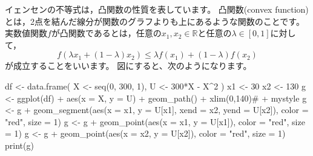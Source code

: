 \documentclass[
  letterpaper,
  pandoc,
  ja=standard,
  jafont = hiragino-pron]{ltjsbook}
\newenvironment{Shaded}{\begin{snugshade}}{\end{snugshade}}
\newcommand{\AttributeTok}[1]{\textcolor[rgb]{0.40,0.45,0.13}{#1}}
\newcommand{\CommentTok}[1]{\textcolor[rgb]{0.37,0.37,0.37}{#1}}
\newcommand{\DecValTok}[1]{\textcolor[rgb]{0.68,0.00,0.00}{#1}}
\newcommand{\FunctionTok}[1]{\textcolor[rgb]{0.28,0.35,0.67}{#1}}
\newcommand{\NormalTok}[1]{\textcolor[rgb]{0.00,0.23,0.31}{#1}}
\newcommand{\OtherTok}[1]{\textcolor[rgb]{0.00,0.23,0.31}{#1}}
\newcommand{\SpecialCharTok}[1]{\textcolor[rgb]{0.37,0.37,0.37}{#1}}
\newcommand{\StringTok}[1]{\textcolor[rgb]{0.13,0.47,0.30}{#1}}
\begin{document}
\begin{tcolorbox}[enhanced jigsaw, colframe=quarto-callout-important-color-frame, breakable, rightrule=.15mm, coltitle=black, title=\textcolor{quarto-callout-important-color}{\faExclamation}\hspace{0.5em}{イェンセンの不等式}, colbacktitle=quarto-callout-important-color!10!white, leftrule=.75mm, colback=white, left=2mm, arc=.35mm, opacityback=0, titlerule=0mm, toptitle=1mm, bottomtitle=1mm, bottomrule=.15mm, toprule=.15mm, opacitybacktitle=0.6]

イェンセンの不等式は，凸関数の性質を表しています。 凸関数(convex
function)とは，2点を結んだ線分が関数のグラフよりも上にあるような関数のことです。
実数値関数\(f\)が凸関数であるとは，任意の\(x_1, x_2 \in \mathbb{R}\)と任意の\(\lambda \in [0,1]\)に対して，
\[
f(\lambda x_1 + (1-\lambda)x_2) \leq \lambda f(x_1) + (1-\lambda)f(x_2)
\] が成立することをいいます。 図にすると、次のようになります。

\begin{Shaded}
\begin{Highlighting}[]
\NormalTok{df }\OtherTok{\textless{}{-}} \FunctionTok{data.frame}\NormalTok{(}
\NormalTok{    X }\OtherTok{\textless{}{-}} \FunctionTok{seq}\NormalTok{(}\DecValTok{0}\NormalTok{, }\DecValTok{300}\NormalTok{, }\DecValTok{1}\NormalTok{),}
\NormalTok{    U }\OtherTok{\textless{}{-}} \DecValTok{300}\SpecialCharTok{*}\NormalTok{X }\SpecialCharTok{{-}}\NormalTok{ X}\SpecialCharTok{\^{}}\DecValTok{2}
\NormalTok{)}
\NormalTok{x1 }\OtherTok{\textless{}{-}} \DecValTok{30}
\NormalTok{x2 }\OtherTok{\textless{}{-}} \DecValTok{130}
\NormalTok{g }\OtherTok{\textless{}{-}} \FunctionTok{ggplot}\NormalTok{(df) }\SpecialCharTok{+} \FunctionTok{aes}\NormalTok{(}\AttributeTok{x =}\NormalTok{ X, }\AttributeTok{y =}\NormalTok{ U) }\SpecialCharTok{+} \FunctionTok{geom\_path}\NormalTok{() }\SpecialCharTok{+} \FunctionTok{xlim}\NormalTok{(}\DecValTok{0}\NormalTok{,}\DecValTok{140}\NormalTok{)}\CommentTok{\# + mystyle}
\NormalTok{g }\OtherTok{\textless{}{-}}\NormalTok{ g }\SpecialCharTok{+} \FunctionTok{geom\_segment}\NormalTok{(}\FunctionTok{aes}\NormalTok{(}\AttributeTok{x =}\NormalTok{ x1, }\AttributeTok{y =}\NormalTok{ U[x1], }\AttributeTok{xend =}\NormalTok{ x2, }\AttributeTok{yend =}\NormalTok{ U[x2]), }\AttributeTok{color =} \StringTok{"red"}\NormalTok{, }\AttributeTok{size =} \DecValTok{1}\NormalTok{)}
\NormalTok{g }\OtherTok{\textless{}{-}}\NormalTok{ g }\SpecialCharTok{+} \FunctionTok{geom\_point}\NormalTok{(}\FunctionTok{aes}\NormalTok{(}\AttributeTok{x =}\NormalTok{ x1, }\AttributeTok{y =}\NormalTok{ U[x1]), }\AttributeTok{color =} \StringTok{"red"}\NormalTok{, }\AttributeTok{size =} \DecValTok{1}\NormalTok{)}
\NormalTok{g }\OtherTok{\textless{}{-}}\NormalTok{ g }\SpecialCharTok{+} \FunctionTok{geom\_point}\NormalTok{(}\FunctionTok{aes}\NormalTok{(}\AttributeTok{x =}\NormalTok{ x2, }\AttributeTok{y =}\NormalTok{ U[x2]), }\AttributeTok{color =} \StringTok{"red"}\NormalTok{, }\AttributeTok{size =} \DecValTok{1}\NormalTok{)}
\FunctionTok{print}\NormalTok{(g)}
\end{Highlighting}
\end{Shaded}


\end{tcolorbox}
\end{document}
